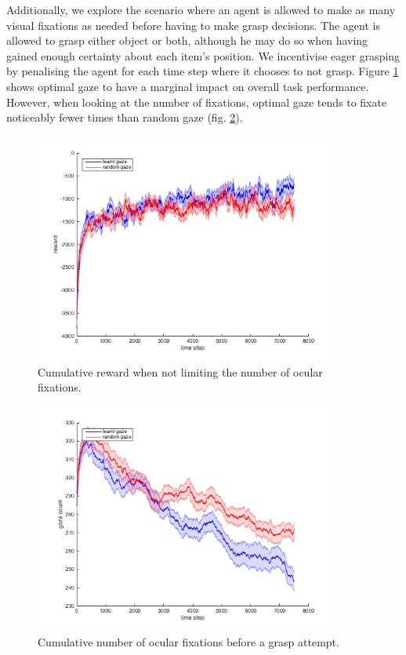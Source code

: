 \documentclass[11]{article}
\begin{document}
Additionally, we explore the scenario where an agent is allowed to make as many visual fixations as needed before having to make grasp decisions. 
The agent is allowed to grasp either object or both, although he may do so when having gained enough certainty about each item's position. 
We incentivise eager grasping by penalising the agent for each time step where it chooses to not grasp.
Figure \ref{fig:resultsTimless} shows optimal gaze to have a marginal impact on overall task performance.
However, when looking at the number of fixations, optimal gaze tends to fixate noticeably fewer times than random gaze (fig. \ref{fig:gazeCount}). 

\begin{figure}[!h]
	\centering
	\includegraphics[width=0.9\textwidth]{figures/resultsTimeless.png}
	\caption{Cumulative reward when not limiting the number of ocular fixations.}
	\label{fig:resultsTimless}
\end{figure}


\begin{figure}[!h]
	\centering
	\includegraphics[width=0.9\textwidth]{figures/gazeCount.png}
	\caption{Cumulative number of ocular fixations before a grasp attempt.}
	\label{fig:gazeCount}
\end{figure}

\pagebreak
\printbibliography
\end{document}

